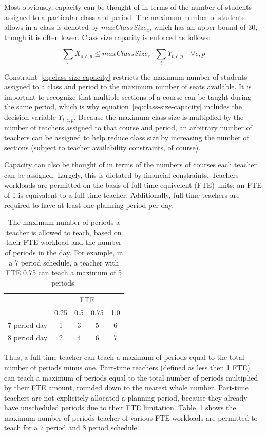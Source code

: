 \documentclass[12pt]{article}
\begin{document}
Most obviously, capacity can be thought of in terms of the number of students assigned to a particular class and period. The maximum number of students allows in a class is denoted by $maxClassSize_{c}$, which has an upper bound of 30, though it is often lower. Class size capacity is enforced as follows:

\begin{equation} \label{eq:class-size-capacity}
	\displaystyle \sum_{s} X_{s,c,p} \leq maxClassSize_{c} \cdot \displaystyle \sum_{t} Y_{t,c,p} \quad \forall c,p
\end{equation}

Constraint~\ref{eq:class-size-capacity} restricts the maximum number of students assigned to a class and period to the maximum number of seats available. It is important to recognize that multiple sections of a course can be taught during the same period, which is why equation~\ref{eq:class-size-capacity} includes the decision variable $Y_{t,c,p}$. Because the maximum class size is multiplied by the number of teachers assigned to that course and period, an arbitrary number of teachers can be assigned to help reduce class size by increasing the number of sections (subject to teacher availability constraints, of course).

Capacity can also be thought of in terms of the numbers of courses each teacher can be assigned. Largely, this is dictated by financial constraints. Teachers workloads are permitted on the basis of full-time equivelent (FTE) units; an FTE of 1 is equivalent to a full-time teacher. Additionally, full-time teachers are required to have at least one planning period per day.

\begin{table}[]
\centering
\caption{The maximum number of periods a teacher is allowed to teach, based on their FTE workload and the number of periods in the day. For example, in a 7 period schedule, a teacher with FTE 0.75 can teach a maximum of 5 periods.}
\label{tab:max-num-periods}
\begin{tabular}{lcccc}
             & \multicolumn{4}{c}{FTE} \\ \cline{2-5} 
             & 0.25 & 0.5 & 0.75 & 1.0 \\ \cline{2-5} 
7 period day & 1    & 3   & 5    & 6   \\
8 period day & 2    & 4   & 6    & 7  
\end{tabular}
\end{table}

Thus, a full-time teacher can teach a maximum of periods equal to the total number of periods minus one. Part-time teachers (defined as less then 1 FTE) can teach a maximum of periods equal to the total number of periods multiplied by their FTE amount, rounded down to the nearest whole number. Part-time teachers are not explicitely allocated a planning period, because they already have unscheduled periods due to their FTE limitation. Table~\ref{tab:max-num-periods} shows the maximum number of periods teacher of various FTE workloads are permitted to teach for a 7 period and 8 period schedule.
\end{document}
